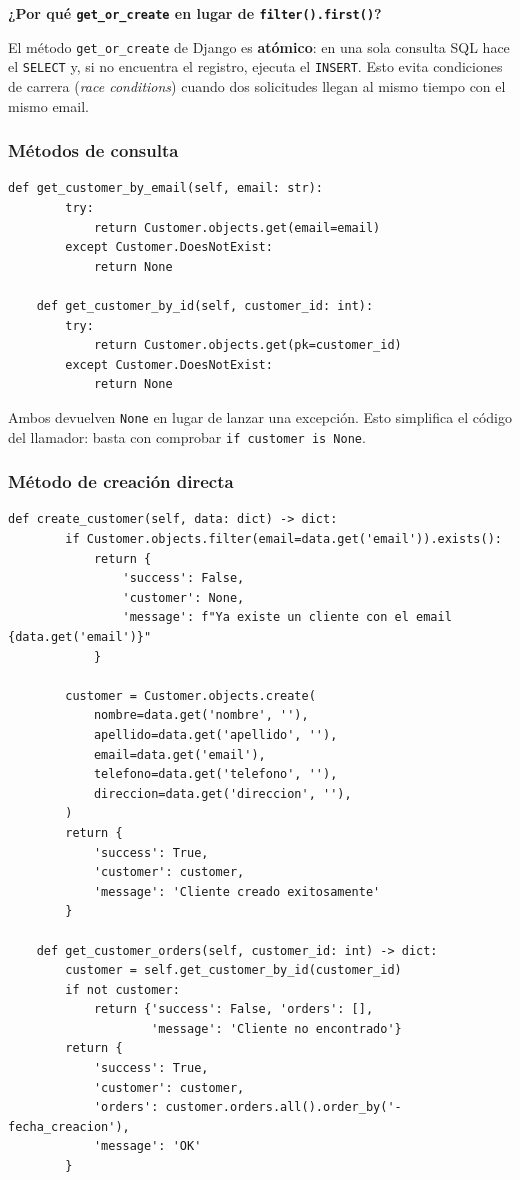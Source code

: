 \documentclass[12pt, a4paper]{article}
\begin{document}
\textbf{¿Por qué \texttt{get\_or\_create} en lugar de \texttt{filter().first()}?}

El método \texttt{get\_or\_create} de Django es \textbf{atómico}: en una sola consulta SQL hace el \texttt{SELECT} y, si no encuentra el registro, ejecuta el \texttt{INSERT}. Esto evita condiciones de carrera (\textit{race conditions}) cuando dos solicitudes llegan al mismo tiempo con el mismo email.

\subsubsection{Métodos de consulta}

\begin{lstlisting}[caption={customers/services.py — métodos de consulta}]
    def get_customer_by_email(self, email: str):
        try:
            return Customer.objects.get(email=email)
        except Customer.DoesNotExist:
            return None

    def get_customer_by_id(self, customer_id: int):
        try:
            return Customer.objects.get(pk=customer_id)
        except Customer.DoesNotExist:
            return None
\end{lstlisting}

Ambos devuelven \texttt{None} en lugar de lanzar una excepción. Esto simplifica el código del llamador: basta con comprobar \texttt{if customer is None}.

\subsubsection{Método de creación directa}

\begin{lstlisting}[caption={customers/services.py — create\_customer}]
    def create_customer(self, data: dict) -> dict:
        if Customer.objects.filter(email=data.get('email')).exists():
            return {
                'success': False,
                'customer': None,
                'message': f"Ya existe un cliente con el email {data.get('email')}"
            }

        customer = Customer.objects.create(
            nombre=data.get('nombre', ''),
            apellido=data.get('apellido', ''),
            email=data.get('email'),
            telefono=data.get('telefono', ''),
            direccion=data.get('direccion', ''),
        )
        return {
            'success': True,
            'customer': customer,
            'message': 'Cliente creado exitosamente'
        }

    def get_customer_orders(self, customer_id: int) -> dict:
        customer = self.get_customer_by_id(customer_id)
        if not customer:
            return {'success': False, 'orders': [],
                    'message': 'Cliente no encontrado'}
        return {
            'success': True,
            'customer': customer,
            'orders': customer.orders.all().order_by('-fecha_creacion'),
            'message': 'OK'
        }
\end{lstlisting}
\end{document}
